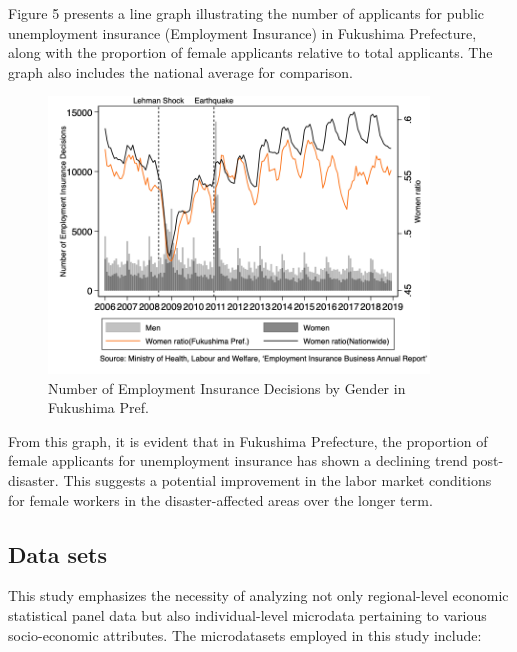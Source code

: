 \documentclass[12pt,halfline,a4paper]{ouparticle}
\begin{document}
Figure 5 presents a line graph illustrating the number of applicants for public unemployment insurance (Employment Insurance) in Fukushima Prefecture, along with the proportion of female applicants relative to total applicants. The graph also includes the national average for comparison. 

\begin{figure}[h!]
    \centering
    \includegraphics[width=0.9\textwidth]{Number of Employment Insurance Decisions_2.png}  %
    \caption{Number of Employment Insurance Decisions by Gender in Fukushima Pref.}
    \label{fig:employment_insurance_decisions}
\end{figure}

From this graph, it is evident that in Fukushima Prefecture, the proportion of female applicants for unemployment insurance has shown a declining trend post-disaster. This suggests a potential improvement in the labor market conditions for female workers in the disaster-affected areas over the longer term.

\newpage

\subsection{Data sets}
\label{sec5.1}

This study emphasizes the necessity of analyzing not only regional-level economic statistical panel data but also individual-level microdata pertaining to various socio-economic attributes. The microdatasets employed in this study include:
\end{document}
